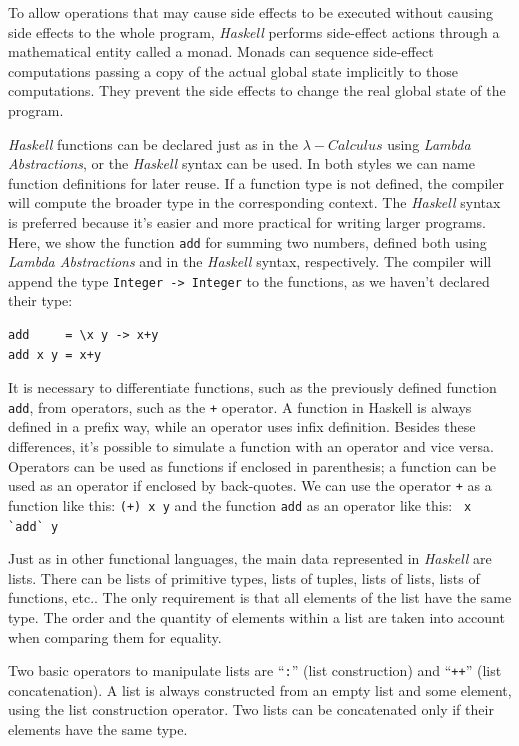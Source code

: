 \documentclass[12pt,twoside]{article}
\numberwithin{spec}{subsection}
\numberwithin{proof}{subsection}
\numberwithin{figure}{subsection}
\numberwithin{code}{subsection}
\begin{document}
To allow operations that may cause side effects to be executed without causing side effects to the whole program, \textit{Haskell} performs side-effect actions through a mathematical entity called a monad. Monads can sequence side-effect computations passing a copy of the actual global state implicitly to those computations. They prevent the side effects to change the real global state of the program.

\textit{Haskell} functions can be declared just as in the $\lambda-Calculus$ using \textit{Lambda Abstractions}, or the \textit{Haskell} syntax can be used. In both styles we can name function definitions for later reuse. If a function type is not defined, the compiler will compute the broader type in the corresponding context. The \textit{Haskell} syntax is preferred because it's easier and more practical for writing larger programs. Here, we show the function \verb.add. for summing two numbers, defined both using \textit{Lambda Abstractions} and in the \textit{Haskell} syntax, respectively. The compiler will append the type \verb.Integer -> Integer. to the functions, as we haven't declared their type:
\begin{verbatim}
add     = \x y -> x+y
add x y = x+y
\end{verbatim}

It is necessary to differentiate functions, such as the previously defined function \verb.add., from operators, such as the \verb.+. operator. A function in Haskell is always defined in a prefix way, while an operator uses infix definition. Besides these differences, it's possible to simulate a function with an operator and vice versa. Operators can be used as functions if enclosed in parenthesis; a function can be used as an operator if enclosed by back-quotes. We can use the operator \verb.+. as a function like this: \verb.(+) x y. and the function \verb.add. as an operator like this: \verb. x `add` y.

Just as in other functional languages, the main data represented in \textit{Haskell} are lists. There can be lists of primitive types, lists of tuples, lists of lists, lists of functions, etc.. The only requirement is that all elements of the list have the same type. The order and the quantity of elements within a list are taken into account when comparing them for equality.

Two basic operators to manipulate lists are ``\verb.:.'' (list construction) and ``\verb.++.'' (list concatenation). A list is always constructed from an empty list and some element, using the list construction operator. Two lists can be concatenated only if their elements have the same type.
\end{document}

